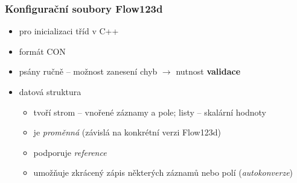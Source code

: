 \documentclass{beamer}
\begin{document}
\begin{frame}
	\frametitle{Konfigurační soubory Flow123d}
	\begin{itemize}
		\item pro inicializaci tříd v C++
		\item formát CON
		\item psány ručně -- možnost zanesení chyb $\rightarrow$ nutnost \textbf{validace}
		\item datová struktura
			\begin{itemize}
				\item tvoří strom -- vnořené záznamy a pole; listy -- skalární hodnoty
				\item je \textit{proměnná} (závislá na konkrétní verzi Flow123d)
				\item podporuje \textit{reference}
				\item umožňuje zkrácený zápis některých záznamů nebo polí (\textit{autokonverze})
			\end{itemize}
	\end{itemize}
\end{frame}
\end{document}
